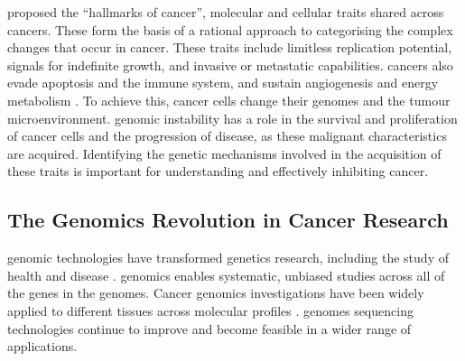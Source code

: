 \citet{Hanahan2000} proposed the ``hallmarks of cancer'', molecular and cellular traits shared across cancers. These form the basis of a rational approach to categorising the complex changes that occur in \gls{cancer}.  %
These traits include limitless replication potential, signals for indefinite growth, and invasive or metastatic capabilities. \Glspl{cancer} also evade apoptosis and the immune system, and sustain angiogenesis and energy metabolism \citep{Hanahan2011}. To achieve this, \gls{cancer} cells change their \glspl{genome} and the \gls{tumour} microenvironment. \Gls{genomic} instability has a role in the survival and proliferation of \gls{cancer} cells and the progression of  disease, as these malignant characteristics are acquired. Identifying the genetic mechanisms involved in the acquisition of these traits is important for understanding and effectively inhibiting \gls{cancer}. %


\subsection{The Genomics Revolution in Cancer Research}
\Gls{genomic} technologies have transformed genetics research, including the study of health and disease \citep{Lander2011, Goodwin2016}. \Glspl{genomic} enables systematic, unbiased studies across all of the genes in the \glspl{genome}. Cancer \glspl{genomic} investigations have been widely applied to different tissues across \glspl{molecular profile} \citep{Bamford2004, ICGC2011, TCGA2013PAN}. \Glspl{genome} sequencing technologies continue to improve and become  feasible in a wider range of applications.


